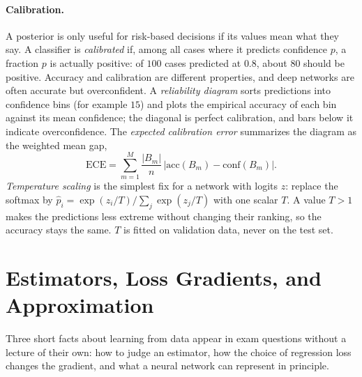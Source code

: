 \paragraph{Calibration.}
A posterior is only useful for risk-based decisions if its values mean what they
say. A classifier is \emph{calibrated} if, among all cases where it predicts
confidence $p$, a fraction $p$ is actually positive: of $100$ cases predicted at
$0.8$, about $80$ should be positive. Accuracy and calibration are different
properties, and deep networks are often accurate but overconfident. A
\emph{reliability diagram} sorts predictions into confidence bins (for example
$15$) and plots the empirical accuracy of each bin against its mean confidence;
the diagonal is perfect calibration, and bars below it indicate
overconfidence. The \emph{expected calibration error} summarizes the diagram as
the weighted mean gap,
\begin{equation}
  \mathrm{ECE} = \sum_{m=1}^{M}\frac{\lvert B_m\rvert}{n}\,
  \bigl\lvert \mathrm{acc}(B_m) - \mathrm{conf}(B_m)\bigr\rvert .
\end{equation}
\noindent
\emph{Temperature scaling} is the simplest fix for a network with logits $z$:
replace the softmax by $\hat p_i = \exp(z_i/T)/\sum_j\exp(z_j/T)$ with one scalar
$T$. A value $T>1$ makes the predictions less extreme without changing their
ranking, so the accuracy stays the same. $T$ is fitted on validation data, never
on the test set.

\section{Estimators, Loss Gradients, and Approximation}
\label{app:estimators}

Three short facts about learning from data appear in exam questions without a
lecture of their own: how to judge an estimator, how the choice of regression
loss changes the gradient, and what a neural network can represent in
principle.

